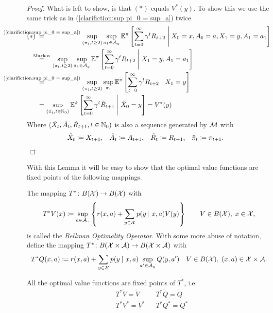 \begin{proof}
	What is left to show, is that \((*)\) equals \(V^*(y)\). To show this we use the same trick as in (\ref{clarifiction:sup pi_0 = sup_a}) twice
	\begin{align*}
		(*)\; &\lxeq{\text{(\ref{clarifiction:sup pi_0 = sup_a})}}\sup_{(\pi_t,t\ge 2)}\sup_{a_1\in\cA_y}
		\E^\pi\left[\sum_{t=0}^\infty \gamma^t R_{t+2}
		\;\middle|\; X_0=x,A_0=a, X_1=y, A_1=a_1\right]
		\\
		&\lxeq{\text{Markov}}\sup_{(\pi_t,t\ge 2)}\sup_{a_1\in\cA_y}
		\E^\pi\left[\sum_{t=0}^\infty \gamma^t R_{t+2}\;\middle|\; X_1=y, A_1=a_1\right]
		\\
		&\lxeq{\text{(\ref{clarifiction:sup pi_0 = sup_a})}}
		\sup_{(\pi_t,t\ge 2)}\sup_{\pi_1}
		\E^\pi\left[\sum_{t=0}^\infty \gamma^t R_{t+2}\;\middle|\; X_1=y\right]
		\\
		&=\sup_{(\tilde{\pi}_t,t\in\N_0)}
		\E^{\tilde{\pi}}\left[\sum_{t=0}^\infty \gamma^t \tilde{R}_{t+1}
		\;\middle|\; \tilde{X}_0=y\right]=V^*(y)
	\end{align*}
	Where \((\tilde{X}_t,\tilde{A}_t,\tilde{R}_{t+1}, t\in\mathbb{N}_0) \) is also a sequence generated by \(\mathcal{M}\) with
	\[
	\begin{aligned}
		&\tilde{X}_t\coloneqq X_{t+1}, && \tilde{A}_t\coloneqq A_{t+1},
		&&\tilde{R}_t\coloneqq R_{t+1},  && \tilde{\pi}_t\coloneqq \pi_{t+1}. 
	\end{aligned} \qedhere
	\]
\end{proof}

With this Lemma it will be easy to show that the optimal value functions are fixed points of the following mappings. 

\begin{definition}
The mapping \(T^*\colon B(\mathcal{X})\to B(\mathcal{X})\) with
	\[
	 T^* V(x)\coloneqq \sup_{a\in\mathcal{A}_x}\left\{r(x,a)+\sum_{y\in\mathcal{X}}p(y\mid x,a) V(y)\right\} \qquad V\in B(\mathcal{X}),\; x\in\mathcal{X},
	\]
is called the \emph{Bellman Optimality Operator}. With some more abuse of notation, define the mapping \(T^*\colon B(\mathcal{X}\times\mathcal{A})\to B(\mathcal{X}\times\mathcal{A})\) with
	\[
	T^* Q(x,a)\coloneqq r(x,a)+\sum_{y\in\mathcal{X}}p(y\mid x,a) \sup_{a'\in\mathcal{A}_y}Q(y,a') 
	\quad V\in B(\mathcal{X}),\; (x,a)\in\mathcal{X}\times\mathcal{A}.
	\]
\end{definition}


\begin{corollary} All the optimal value functions are fixed points of \(T^*\), i.e. 
	\begin{align*}
	&T^*\tilde{V}=\tilde{V}  && T^*\tilde{Q}=\tilde{Q}\\
	&T^*V^*=V^* && T^*Q^*=Q^*
	\end{align*}
\end{corollary}

